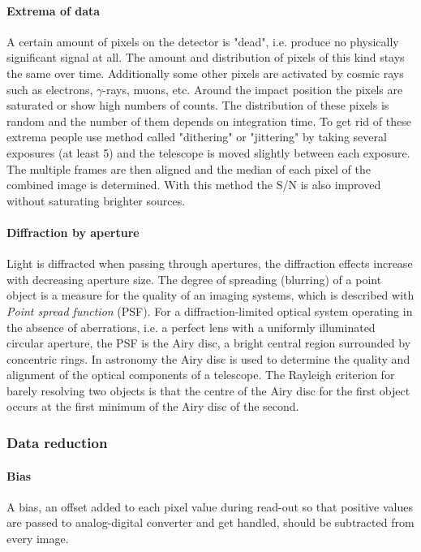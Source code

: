 \paragraph{Extrema of data}
A certain amount of pixels on the detector is "dead", i.e. produce no physically significant signal at all. The amount and distribution of pixels of this kind stays the same over time. Additionally some other pixels are activated by cosmic rays such as electrons, $\gamma$-rays, muons, etc. Around the impact position the pixels are saturated or show high numbers of counts. The distribution of these pixels is random and the number of them depends on integration time. To get rid of these extrema people use method called "dithering" or "jittering" by taking several exposures (at least 5) and the telescope is moved slightly between each exposure. The multiple frames are then aligned and the median of each pixel of the combined image is determined. With this method the S/N is also improved without saturating brighter sources.

\paragraph{Diffraction by aperture}
Light is diffracted when passing through apertures, the diffraction effects increase with decreasing aperture size. The degree of spreading (blurring) of a point object is a measure for the quality of an imaging systems, which is described with \textit{Point spread function} (PSF). For a diffraction-limited optical system operating in the absence of aberrations, i.e. a perfect lens with a uniformly illuminated circular aperture, the PSF is the Airy disc, a bright central region surrounded by concentric rings. In astronomy the Airy disc is used to determine the quality and alignment of the optical components of a telescope. The Rayleigh criterion for barely resolving two objects is that the centre of the Airy disc for the first object occurs at the first minimum of the Airy disc of the second.

\subsubsection{Data reduction}
\paragraph{Bias}
A bias, an offset added to each pixel value during read-out so that positive values are passed to analog-digital converter and get handled, should be subtracted from every image.

